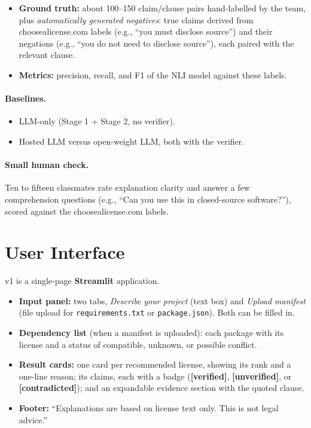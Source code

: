 \documentclass[11pt]{article}
\newcommand{\verified}{\textcolor{okgreen}{\textbf{[verified]}}}
\newcommand{\unverified}{\textcolor{warnamber}{\textbf{[unverified]}}}
\newcommand{\contradicted}{\textcolor{badred}{\textbf{[contradicted]}}}
\begin{document}
\begin{description}[leftmargin=0pt,style=nextline]
  \item[Reliability of the NLI verifier]
  \begin{itemize}
    \item \textbf{Ground truth:} about 100--150 claim/clause pairs hand-labelled by the team, plus \emph{automatically generated negatives}: true claims derived from choosealicense.com labels (e.g., ``you must disclose source'') and their negations (e.g., ``you do not need to disclose source''), each paired with the relevant clause.
    \item \textbf{Metrics:} precision, recall, and F1 of the NLI model against these labels.
  \end{itemize}
\end{description}

\paragraph{Baselines.}
\begin{itemize}
  \item LLM-only (Stage 1 + Stage 2, no verifier).
  \item Hosted LLM versus open-weight LLM, both with the verifier.
\end{itemize}

\paragraph{Small human check.}
Ten to fifteen classmates rate explanation clarity and answer a few comprehension questions (e.g., ``Can you use this in closed-source software?''), scored against the choosealicense.com labels.

\section{User Interface}

v1 is a single-page \textbf{Streamlit} application.

\begin{itemize}
  \item \textbf{Input panel:} two tabs, \emph{Describe your project} (text box) and \emph{Upload manifest} (file upload for \texttt{requirements.txt} or \texttt{package.json}). Both can be filled in.
  \item \textbf{Dependency list} (when a manifest is uploaded): each package with its license and a status of compatible, unknown, or possible conflict.
  \item \textbf{Result cards:} one card per recommended license, showing its rank and a one-line reason; its claims, each with a badge (\verified, \unverified, or \contradicted); and an expandable evidence section with the quoted clause.
  \item \textbf{Footer:} ``Explanations are based on license text only. This is not legal advice.''
\end{itemize}
\end{document}

